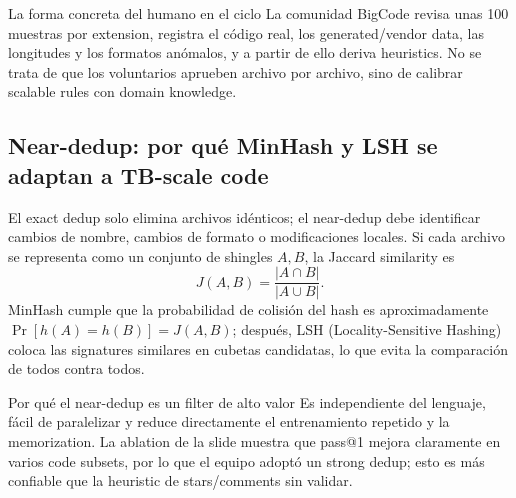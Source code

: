 
\begin{knowledgebox}{La forma concreta del humano en el ciclo}
La comunidad BigCode revisa unas 100 muestras por extension, registra el código real, los generated/vendor data, las longitudes y los formatos anómalos, y a partir de ello deriva heuristics. No se trata de que los voluntarios aprueben archivo por archivo, sino de calibrar scalable rules con domain knowledge.
\end{knowledgebox}


\subsection{Near-dedup: por qué MinHash y LSH se adaptan a TB-scale code}

El exact dedup solo elimina archivos idénticos; el near-dedup debe identificar cambios de nombre, cambios de formato o modificaciones locales. Si cada archivo se representa como un conjunto de shingles $A,B$, la Jaccard similarity es
\[
J(A,B)=\frac{|A\cap B|}{|A\cup B|}.
\]
MinHash cumple que la probabilidad de colisión del hash es aproximadamente $\Pr[h(A)=h(B)]=J(A,B)$; después, LSH (Locality-Sensitive Hashing) coloca las signatures similares en cubetas candidatas, lo que evita la comparación de todos contra todos.


\begin{importantbox}{Por qué el near-dedup es un filter de alto valor}
Es independiente del lenguaje, fácil de paralelizar y reduce directamente el entrenamiento repetido y la memorization. La ablation de la slide muestra que pass@1 mejora claramente en varios code subsets, por lo que el equipo adoptó un strong dedup; esto es más confiable que la heuristic de stars/comments sin validar.
\end{importantbox}


